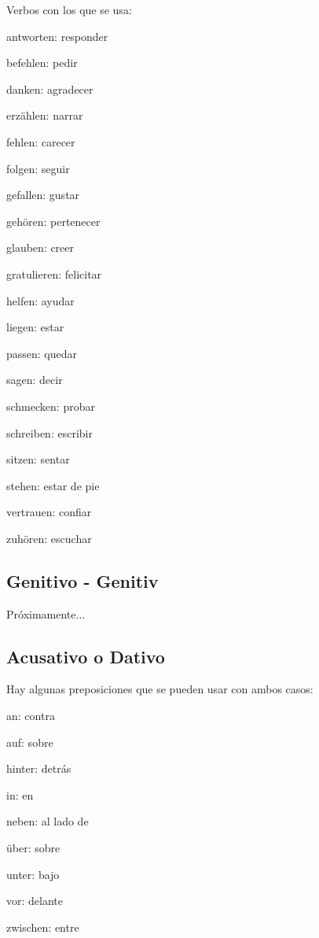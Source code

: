 Verbos con los que se usa:
\begin{multicols}{2}
\begin{myitemize}
\item antworten: responder
\item befehlen: pedir
\item danken: agradecer
\item erzählen: narrar
\item fehlen: carecer
\item folgen: seguir
\item gefallen: gustar
\item gehören: pertenecer
\item glauben: creer
\item gratulieren: felicitar
\item helfen: ayudar
\item liegen: estar
\item passen: quedar
\item sagen: decir
\item schmecken: probar
\item schreiben: escribir
\item sitzen: sentar
\item stehen: estar de pie
\item vertrauen: confiar
\item zuhören: escuchar
\end{myitemize}
\end{multicols}

\subsection{Genitivo - Genitiv}
Próximamente...

\subsection{Acusativo o Dativo}
Hay algunas preposiciones que se pueden usar con ambos casos:
\begin{myitemize}
\item an: contra
\item auf: sobre
\item hinter: detrás
\item in: en
\item neben: al lado de
\item über: sobre
\item unter: bajo
\item vor: delante
\item zwischen: entre
\end{myitemize}

